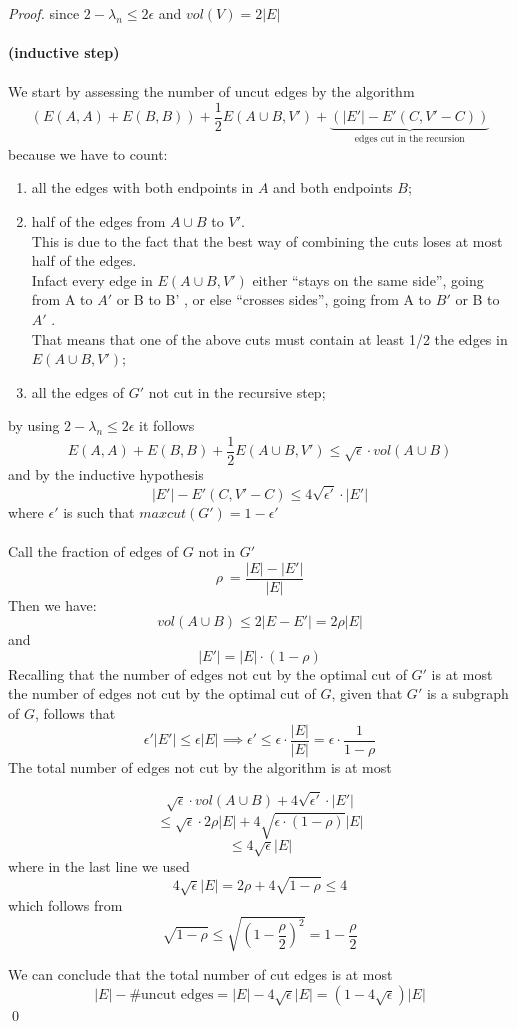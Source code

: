\begin{lemma}
\begin{proof}
		since $ 2-\lambda_n \leq 2\epsilon $ and $ vol(V) = 2|E| $
		\\
		\\
		\textbf{(inductive step)}
		\\
		\\
		We start by assessing the number of uncut edges by the algorithm
		\[ (E(A,A) + E(B,B))
		+ \frac{1}{2}E(A \cup B, V') 
		+ \underbrace{(|E'| - E'(C,V'-C))}_\text{edges cut in the recursion} 
		\]
		because we have to count:
		\begin{enumerate}
			\item all the edges with both endpoints in $ A $ and both endpoints $ B $;
			\item half of the edges from $ A \cup B  $ to $ V' $.\\
			This is due to the fact that the best way of combining the cuts loses at most half of the edges. \\
			Infact every edge in $ E(A \cup B, V') $ either “stays on the same side”, going from A to $ A' $ or
			B to B' , or else “crosses sides”, going from A to $ B' $ or B to $ A' $ .\\
			That means that one of the above cuts must contain at least 1/2 the edges in $ E(A \cup B, V') $;
			\item all the edges of $ G' $ not cut in the recursive step;
		\end{enumerate}
		by using $ 2-\lambda_n \leq 2\epsilon $ it follows
		\[  E(A,A) + E(B,B) + \frac{1}{2}E(A \cup B, V') \leq \sqrt{\epsilon} \cdot vol(A \cup B) \]
		and by the inductive hypothesis
		\[ |E'| - E'(C,V'-C) \leq 4\sqrt{\epsilon'} \cdot |E'| \]
		where $ \epsilon' $ is such that $ maxcut(G') = 1-\epsilon' $ \\\\
		Call the fraction of edges of $ G $ not in $ G' $
		\[ \rho\ = \frac{|E|-|E'|}{|E|}\]
		Then we have:
		\[vol(A \cup B) \leq 2|E-E'| = 2\rho |E| \]
		and
		\[ |E'| = |E| \cdot (1-\rho) \]
		Recalling that the number of edges not cut by the optimal cut of $ G' $ is at most the number of edges not cut by the optimal cut of $ G $, given that $ G' $ is a subgraph of $ G $, follows that
		\[ \epsilon'|E'| \leq \epsilon|E| \implies \epsilon' \leq \epsilon \cdot \frac{|E|}{|E|} = \epsilon \cdot \frac{1}{1- \rho} \]
		The total number of edges not cut by the algorithm is at most
		
		\[ \sqrt{\epsilon} \cdot vol(A \cup B) + 4\sqrt{\epsilon'} \cdot |E'| \]
		\[ \leq \sqrt{\epsilon} \cdot 2\rho|E| + 4\sqrt{\epsilon \cdot (1 - \rho)} |E| \]
		\[\leq 4\sqrt{\epsilon} |E| \]
		where in the last line we used
		\[  4\sqrt{\epsilon}|E| =  2 \rho + 4 \sqrt{1- \rho} \leq 4 \]
		which follows from
		\[ \sqrt{1- \rho} \leq \sqrt{(1- \frac{\rho}{2})^2} = 1- \frac{\rho}{2} \]
		
		We can conclude that the total number of cut edges is at most 
		\[ |E| - \#\text{uncut edges} = |E|- 4\sqrt{\epsilon}|E| = (1 - 4\sqrt{\epsilon})|E|  \]
		\qed
	\end{proof}
\end{lemma}

